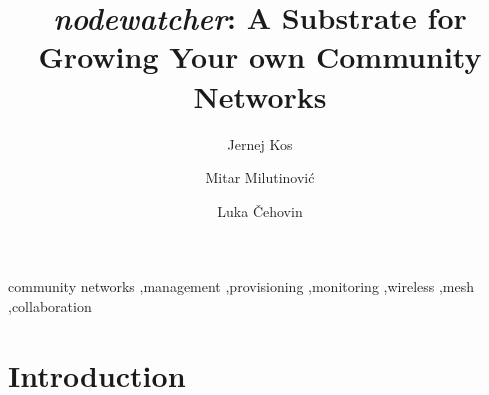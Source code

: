\documentclass[5p,sort&compress]{elsarticle}
\newcommand{\nodewatcher}{\textit{nodewatcher}}
\newcommand{\wlanslovenija}{\textit{wlan slovenija}}
\begin{document}
\begin{frontmatter}
\title{\nodewatcher{}: A Substrate for Growing Your own Community Networks}

\author[fri,wlansi]{Jernej Kos}

\author[berkeley,wlansi]{Mitar Milutinović}

\author[fri,wlansi]{Luka Čehovin}


\address[fri]{University of Ljubljana, Faculty of Computer and Information Science, Ljubljana, Slovenia}

\address[berkeley]{University of California, Berkeley, USA}

\address[wlansi]{\wlanslovenija{}, Open wireless network of Slovenia, \url{https://wlan-si.net}}

\begin{abstract}
\end{abstract}

\begin{keyword}
community networks \sep management \sep provisioning \sep monitoring \sep wireless \sep mesh \sep collaboration
\end{keyword}
\end{frontmatter}

\section{Introduction}
\end{document}
